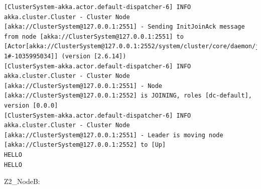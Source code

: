 \documentclass[12pt]{article}
\begin{document}
\begin{verbatim}
[ClusterSystem-akka.actor.default-dispatcher-6] INFO akka.cluster.Cluster - Cluster Node [akka://ClusterSystem@127.0.0.1:2551] - Sending InitJoinAck message from node [akka://ClusterSystem@127.0.0.1:2551] to [Actor[akka://ClusterSystem@127.0.0.1:2552/system/cluster/core/daemon/joinSeedNodeProcess-1#-1035995034]] (version [2.6.14])
[ClusterSystem-akka.actor.default-dispatcher-6] INFO akka.cluster.Cluster - Cluster Node [akka://ClusterSystem@127.0.0.1:2551] - Node [akka://ClusterSystem@127.0.0.1:2552] is JOINING, roles [dc-default], version [0.0.0]
[ClusterSystem-akka.actor.default-dispatcher-6] INFO akka.cluster.Cluster - Cluster Node [akka://ClusterSystem@127.0.0.1:2551] - Leader is moving node [akka://ClusterSystem@127.0.0.1:2552] to [Up]
HELLO
HELLO
\end{verbatim}


Z2\_NodeB:
\end{document}

